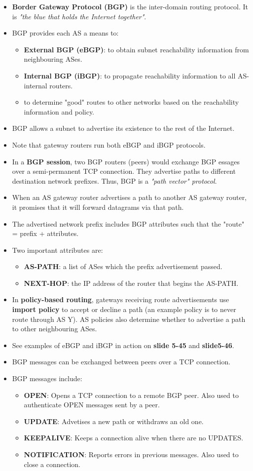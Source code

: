 \documentclass{article}
\begin{document}
\begin{itemize}
\item {\bf Border Gateway Protocol (BGP)} is the inter-domain routing protocol. It is \emph{"the blue that holds the Internet together"}.
\item BGP provides each AS a means to:
\begin{itemize}
\item {\bf External BGP (eBGP)}: to obtain subnet reachability information from neighbouring ASes.
\item {\bf Internal BGP (iBGP)}: to propagate reachability information to all AS-internal routers.
\item to determine "good" routes to other networks based on the reachability information and policy.
\end{itemize}
\item BGP allows a subnet to advertise its existence to the rest of the Internet.
\item Note that gateway routers run both eBGP and iBGP protocols.
\item In a {\bf BGP session}, two BGP routers (peers) would exchange BGP essages over a semi-permanent TCP connection. They advertise paths to different destination network prefixes. Thus, BGP is a \emph{"path vector" protocol}.
\item When an AS gateway router advertises a path to another AS gateway router, it promises that it will forward datagrams via that path.
\item The advertised network prefix includes BGP attributes such that the "route" = prefix + attributes.
\item Two important attributes are:
\begin{itemize}
\item {\bf AS-PATH}: a list of ASes which the prefix advertisement passed.
\item {\bf NEXT-HOP}: the IP address of the router that begins the AS-PATH.
\end{itemize}
\item In {\bf policy-based routing}, gateways receiving route advertisements use {\bf import policy} to accept or decline a path (an example policy is to never route through AS Y). AS policies also determine whether to advertise a path to other neighbouring ASes.
\item See examples of eBGP and iBGP in action on {\bf slide 5-45} and {\bf slide5-46}.
\item BGP messages can be exchanged between peers over a TCP connection.
\item BGP messages include:
\begin{itemize}
\item {\bf OPEN}: Opens a TCP connection to a remote BGP peer. Also used to authenticate OPEN messages sent by a peer.
\item {\bf UPDATE}: Advetises a new path or withdraws an old one.
\item {\bf KEEPALIVE}: Keeps a connection alive when there are no UPDATES. 
\item {\bf NOTIFICATION}: Reports errors in previous messages. Also used to close a connection.


\end{itemize}
\end{itemize}
\end{document}
